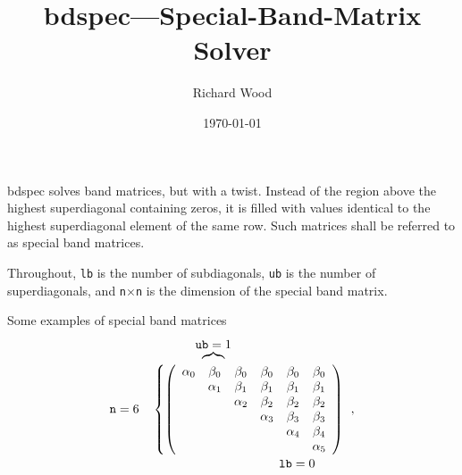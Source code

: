 \documentclass[10pt]{article}
\title{bdspec---Special-Band-Matrix Solver}
\author{Richard Wood}
\date{\today}
\begin{document}
\maketitle

bdspec solves band matrices, but with a twist.  Instead of the region above the
highest superdiagonal containing zeros, it is filled with values identical to
the highest superdiagonal element of the same row. Such matrices shall be
referred to as special band matrices.

Throughout, \texttt{lb} is the number of subdiagonals, \texttt{ub} is the
number of superdiagonals, and \texttt{n}$\times$\texttt{n} is the dimension of the
special band matrix.

Some examples of special band matrices 
\begin{alignat}{2}
  \nonumber
  &&&\hspace{3.5em}\mbox{\raisebox{-1em}{$\overbrace{\quad}^{\displaystyle\texttt{ub}=1}$}} \\
  &\texttt{n}=6  &
  &\left\{\left(
  \begin{array}{cccccccc}
    \alpha_0 & \beta_0 & \beta_0 & \beta_0 & \beta_0 &\beta_0 \\
            & \alpha_1 & \beta_1 & \beta_1 & \beta_1 &\beta_1 \\
            &         & \alpha_2 & \beta_2 & \beta_2 &\beta_2 \\
            &         &         & \alpha_3 & \beta_3 &\beta_3 \\
            &         &         &         & \alpha_4 &\beta_4 \\
            &         &         &         &         &\alpha_5 \\
  \end{array}
  \right)\right.
  ~,\\
  \nonumber
  &&&\hspace{10.2em}\mbox{\raisebox{2em}{${\displaystyle\texttt{lb}=0}$}}
\end{alignat}
\end{document}

